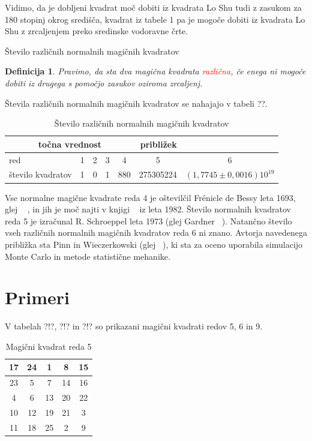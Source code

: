 \documentclass[a4paper,12pt]{article}
\newtheorem{definicija}[izrek]{Definicija}
\begin{document}
Vidimo, da je dobljeni kvadrat moč dobiti iz kvadrata Lo Shu tudi z zasukom za
180 stopinj okrog središča, kvadrat iz tabele 1 pa je mogoče dobiti
iz kvadrata Lo Shu z zrcaljenjem preko sredinske vodoravne črte.

Število različnih normalnih magičnih kvadratov

\begin{definicija}
      Pravimo, da sta dva magična kvadrata \textcolor{red}{\emph{različna}}, če enega ni mogoče dobiti
      iz drugega s pomočjo zasukov oziroma zrcaljenj.
\end{definicija}

Števila različnih normalnih magičnih kvadratov se nahajajo v tabeli ??.

\begin{table}[h]
   \centering
   \caption{Število različnih normalnih magičnih kvadratov}
   \begin{tabular}{lcccccc}
   \toprule
   \multicolumn{5}{c}{točna vrednost} & \multicolumn{1}{r}{približek} \\ 
   \midrule
   red & 1 & 2 & 3 & 4 & 5 & 6 \\
   \midrule
   število kvadratov & 1  & 0  & 1  & 880  & 275305224  & $(1,7745 \pm 0,0016)10^{19}$ \\ 
   \bottomrule
   \end{tabular}
   \label{table:stevila}
\end{table}

Vse normalne magične kvadrate reda 4 je oštevilčil Frénicle de Bessy
leta 1693, glej ~\cite{bessy} , in jih je moč najti v knjigi ~\cite{berlekamp}
iz leta 1982. Število normalnih kvadratov reda 5 je izračunal
R. Schroeppel leta 1973 (glej Gardner ~\cite{gardner}).
Natančno število vseh različnih normalnih magičnih kvadratov reda 6 ni znano.
Avtorja navedenega približka sta Pinn in Wieczerkowski (glej ~\cite{pinn}), ki
sta za oceno uporabila simulacijo Monte Carlo in metode statistične mehanike.


\section{Primeri}

V tabelah ?!?, ?!? in ?!? so prikazani
magični kvadrati redov 5, 6 in 9.

\begin{table}
   \centering
   \large
   \caption{Magični kvadrat reda 5}
   \begin{tabular}{|c|c|c|c|c|}
      \hline
      17 & 24 &  1 &  8 & 15 \\\hline
      23 &  5 &  7 & 14 & 16 \\\hline
      4 &  6 & 13 & 20 & 22 \\\hline
      10 & 12 & 19 & 21 &  3 \\\hline
      11 & 18 & 25 &  2 &  9 \\\hline
   \end{tabular}
   \label{table:mag5}
\end{table}
\end{document}
